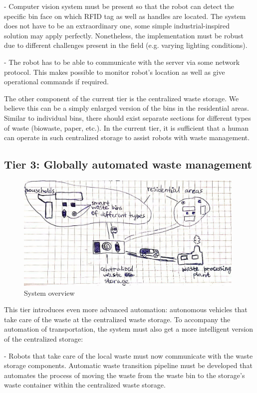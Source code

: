\documentclass{article}
\begin{document}
- Computer vision system must be present so that the robot can detect the specific bin face on which
RFID tag as well as handles are located. The system does not have to be an extraordinary one, some
simple industrial-inspired solution may apply perfectly. Nonetheless, the implementation must be
robust due to different challenges present in the field (e.g. varying lighting conditions).

- The robot has to be able to communicate with the server via some network protocol. This makes
possible to monitor robot's location as well as give operational commands if required.

The other component of the current tier is the centralized waste storage. We believe this can be a
simply enlarged version of the bins in the residential areas. Similar to individual bins, there
should exist separate sections for different types of waste (biowaste, paper, etc.). In the current
tier, it is sufficient that a human can operate in such centralized storage to assist robots with
waste management.

\subsection{Tier 3: Globally automated waste management}

\begin{figure}[ht!]
\centering
\includegraphics[width=110mm]{./high_level_scheme.jpg}
\caption{System overview}
\end{figure}

This tier introduces even more advanced automation: autonomous vehicles that take care of the waste
at the centralized waste storage. To accompany the automation of transportation, the system must
also get a more intelligent version of the centralized storage:

- Robots that take care of the local waste must now communicate with the waste storage components.
Automatic waste transition pipeline must be developed that automates the process of moving the waste
from the waste bin to the storage's waste container within the centralized waste storage.
\end{document}
